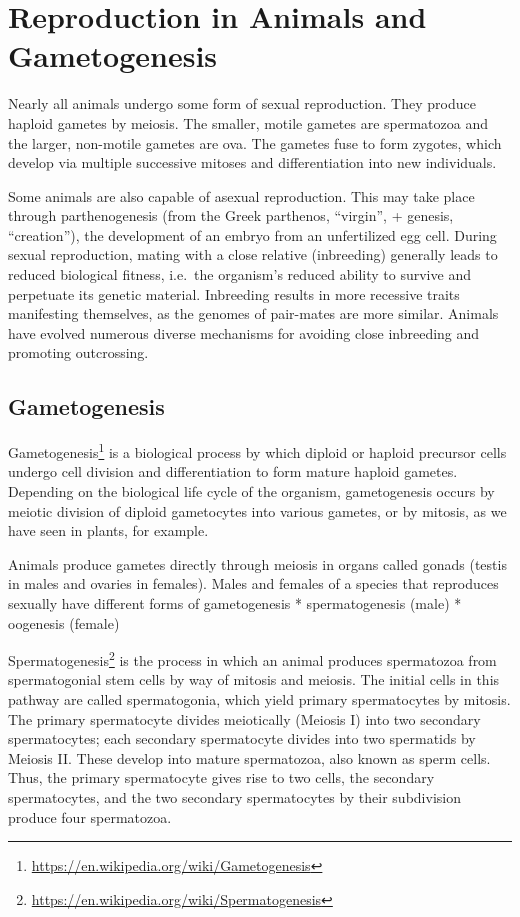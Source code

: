 \documentclass[]{book}
\let\rmarkdownfootnote\footnote%
\def\footnote{\protect\rmarkdownfootnote}
\renewcommand{\href}[2]{#2\footnote{\url{#1}}}
\theoremstyle{definition}
\theoremstyle{definition}
\theoremstyle{definition}
\theoremstyle{remark}
\begin{document}
\chapter{Reproduction in Animals and
Gametogenesis}\label{reproduction-in-animals-and-gametogenesis}

Nearly all animals undergo some form of sexual reproduction. They
produce haploid gametes by meiosis. The smaller, motile gametes are
spermatozoa and the larger, non-motile gametes are ova. The gametes fuse
to form zygotes, which develop via multiple successive mitoses and
differentiation into new individuals.

Some animals are also capable of asexual reproduction. This may take
place through parthenogenesis (from the Greek parthenos, ``virgin'', +
genesis, ``creation''), the development of an embryo from an
unfertilized egg cell. During sexual reproduction, mating with a close
relative (inbreeding) generally leads to reduced biological fitness,
i.e.~the organism's reduced ability to survive and perpetuate its
genetic material. Inbreeding results in more recessive traits
manifesting themselves, as the genomes of pair-mates are more similar.
Animals have evolved numerous diverse mechanisms for avoiding close
inbreeding and promoting outcrossing.

\section{Gametogenesis}\label{gametogenesis}

\href{https://en.wikipedia.org/wiki/Gametogenesis}{Gametogenesis} is a
biological process by which diploid or haploid precursor cells undergo
cell division and differentiation to form mature haploid gametes.
Depending on the biological life cycle of the organism, gametogenesis
occurs by meiotic division of diploid gametocytes into various gametes,
or by mitosis, as we have seen in plants, for example.

Animals produce gametes directly through meiosis in organs called gonads
(testis in males and ovaries in females). Males and females of a species
that reproduces sexually have different forms of gametogenesis *
spermatogenesis (male) * oogenesis (female)

\href{https://en.wikipedia.org/wiki/Spermatogenesis}{Spermatogenesis} is
the process in which an animal produces spermatozoa from spermatogonial
stem cells by way of mitosis and meiosis. The initial cells in this
pathway are called spermatogonia, which yield primary spermatocytes by
mitosis. The primary spermatocyte divides meiotically (Meiosis I) into
two secondary spermatocytes; each secondary spermatocyte divides into
two spermatids by Meiosis II. These develop into mature spermatozoa,
also known as sperm cells. Thus, the primary spermatocyte gives rise to
two cells, the secondary spermatocytes, and the two secondary
spermatocytes by their subdivision produce four spermatozoa.
\end{document}
